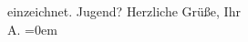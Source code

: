 \begin{ledgroupsized}[t]{13cm}
{{{                  einzeichnet.}}}\label{K_L01619_1h}\pend
           \pstart
           Jugend?\pend
           \pstart
           \label{T_L01619_1v}\label{T_L01619_1h}\pend
           \pstart
           {\pb}Herzliche Grüße,\pend
           \pstart
           Ihr{\\[\baselineskip]}\spacefill\mbox{A.}\pend
           \leftskip=0em{}\endnumbering{}\end{ledgroupsized}  \newcommand{\dateiname}{L01619}\newcommand{\titel}{Arthur Schnitzler an Richard Beer-Hofmann, 1. 8. 1906}\newcommand{\editorInnen}{Martin Anton Müller und Gerd-Hermann Susen}
            \footnotesize
\begin{ledgroupsized}[t]{11.5cm}
\end{ledgroupsized}
         
      